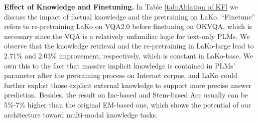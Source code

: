 \documentclass[sigconf]{acmart}
\newcommand{\cjy}[1]{{\color{black}#1}}
\begin{document}
\noindent\textbf{Effect of Knowledge and Finetuning.} In Table \ref{tab:Ablation of KF} we discuss the \cjy{impact} of factual knowledge and the pretraining on LaKo. 
``Finetune'' refers to re-pretraining LaKo on VQA2.0 before finetuning on OKVQA, which is necessary since the VQA is a relatively unfamiliar logic for text-only PLMs. 
We observe that the knowledge retrieval and the re-pretraining in LaKo-large lead to 2.71\% and 2.03\% improvement, respectively, which is constant in LaKo-base. We own this to the fact that massive implicit knowledge is contained in PLMs' parameter after the pretraining process on Internet corpus, and LaKo could further exploit those explicit external knowledge to support more precise answer prediction.
Besides, the result on Inc-based and Stem-based Acc usually can be 5\%-7\% higher than the original EM-based one, which shows the potential of our architecture toward multi-modal knowledge tasks.
\begin{table}[htbp]
\vspace{-1mm}
    \centering
     \caption{Ablation study (\%) for the effect of knowledge and finetuning. The full names of these abbreviations: w/o (without), KGR (Knowledge Graph Retrieval). ``Finetune'' refers to re-pretraining LaKo on VQA2.0 dataset first. 
    }
    \addtolength\tabcolsep{1pt}

    \label{tab:Ablation of KF}
    \vspace{-2mm}
\end{table}
\end{document}
